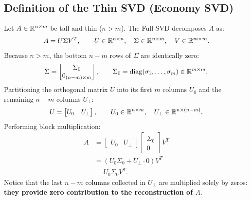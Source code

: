 \subsection{Definition of the Thin SVD (Economy SVD)}

Let $A \in \mathbb{R}^{n \times m}$ be tall and thin ($n > m$). The Full SVD decomposes $A$ as:
\begin{equation}
    A = U \Sigma V^T, \qquad U \in \mathbb{R}^{n \times n}, \quad \Sigma \in \mathbb{R}^{n \times m}, \quad V \in \mathbb{R}^{m \times m}.
\end{equation}
Because $n > m$, the bottom $n - m$ rows of $\Sigma$ are identically zero:
\begin{equation}
    \Sigma = \begin{bmatrix} \Sigma_0 \\ 0_{(n-m) \times m} \end{bmatrix}, \qquad \Sigma_0 = \operatorname{diag}(\sigma_1, \dots, \sigma_m) \in \mathbb{R}^{m \times m}.
\end{equation}
Partitioning the orthogonal matrix $U$ into its first $m$ columns $U_0$ and the remaining $n - m$ columns $U_\perp$:
\begin{equation}
    U = \begin{bmatrix} U_0 & U_\perp \end{bmatrix}, \qquad U_0 \in \mathbb{R}^{n \times m}, \quad U_\perp \in \mathbb{R}^{n \times (n - m)}.
\end{equation}
Performing block multiplication:
\begin{align}
    A &= \begin{bmatrix} U_0 & U_\perp \end{bmatrix} \begin{bmatrix} \Sigma_0 \\ 0 \end{bmatrix} V^T \nonumber \\
      &= \left( U_0 \Sigma_0 + U_\perp \cdot 0 \right) V^T \nonumber \\
      &= U_0 \Sigma_0 V^T.
\end{align}
Notice that the last $n - m$ columns collected in $U_\perp$ are multiplied solely by zeros: \textbf{they provide zero contribution to the reconstruction of $A$}.


